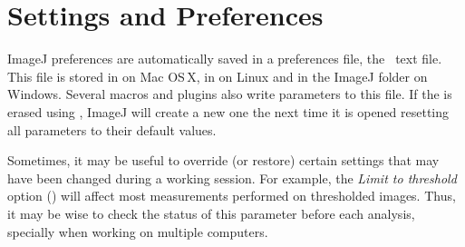 \section[Settings and Preferences]{Settings and Preferences\label{sec:Settings-and-Preferences}\improvement{}}

ImageJ
preferences are automatically saved in a preferences file, the\texttt{
} text file. This file is stored in 
on Mac OS\,X, in  on Linux and in the
ImageJ folder on Windows. Several macros and plugins also write parameters
to this file. If the  is erased using
,
ImageJ will create a new one the next time it is opened resetting
all parameters to their default values. 

Sometimes, it may be useful to override (or restore) certain settings
that may have been changed during a working session. For example,
the \emph{Limit to threshold} option ()
will affect most measurements performed on thresholded images. Thus,
it may be wise to check the status of this parameter before each analysis,
specially when working on multiple computers.

